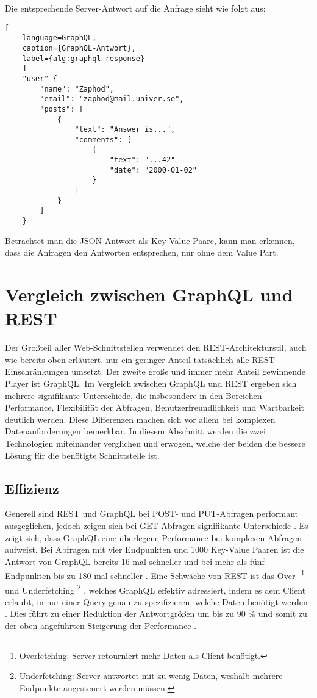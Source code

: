 \documentclass[draft,final]{vutinfth} %
\begin{document}
Die entsprechende Server-Antwort auf die Anfrage sieht wie folgt aus:

\begin{lstlisting}[
	language=GraphQL, 
	caption={GraphQL-Antwort}, 
	label={alg:graphql-response}
	]
	"user" {
		"name": "Zaphod",
		"email": "zaphod@mail.univer.se",
		"posts": [
			{
				"text": "Answer is...",
				"comments": [
					{
						"text": "...42"
						"date": "2000-01-02"
					}
				]
			}
		]
	}
\end{lstlisting}

Betrachtet man die JSON-Antwort als Key-Value Paare, kann man erkennen, dass die Anfragen den Antworten entsprechen, nur ohne dem Value Part.


\section{Vergleich zwischen GraphQL und REST}

Der Großteil aller Web-Schnittstellen verwendet den REST-Architekturstil, auch wie bereits oben erläutert, nur ein geringer Anteil tatsächlich alle REST-Einschränkungen umsetzt.
Der zweite große und immer mehr Anteil gewinnende Player ist GraphQL.
Im Vergleich zwischen GraphQL und REST ergeben sich mehrere signifikante Unterschiede, die insbesondere in den Bereichen Performance, Flexibilität der Abfragen, Benutzerfreundlichkeit und Wartbarkeit deutlich werden. 
Diese Differenzen machen sich vor allem bei komplexen Datenanforderungen bemerkbar.
In diesem Abschnitt werden die zwei Technologien miteinander verglichen und erwogen, welche der beiden die bessere Lösung für die benötigte Schnittstelle ist.


\subsection{Effizienz}

Generell sind REST und GraphQL bei POST- und PUT-Abfragen performant ausgeglichen, jedoch zeigen sich bei GET-Abfragen signifikante Unterschiede \cite{Vohra:2022:GraphVsRestImplementation}.
Es zeigt sich, dass GraphQL eine überlegene Performance bei komplexen Abfragen aufweist.
Bei Abfragen mit vier Endpunkten und 1000 Key-Value Paaren ist die Antwort von GraphQL bereits 16-mal schneller und bei mehr als fünf Endpunkten bis zu 180-mal schneller \cite{Quinamera:2023:GraphMappingStudy}.
Eine Schwäche von REST ist das Over-
\footnote{
	Overfetching: Server retourniert mehr Daten als Client benötigt.
}
und Underfetching
\footnote{
	Underfetching: Server antwortet mit zu wenig Daten, weshalb mehrere Endpunkte angesteuert werden müssen.
}
, welches GraphQL effektiv adressiert, indem es dem Client erlaubt, in nur einer Query genau zu spezifizieren, welche Daten benötigt werden \cite{Brito:2019:MigratingToGraphQL}. 
Dies führt zu einer Reduktion der Antwortgrößen um bis zu 90 \% und somit zu der oben angeführten Steigerung der Performance \cite{Brito:2019:MigratingToGraphQL}.
\end{document}
